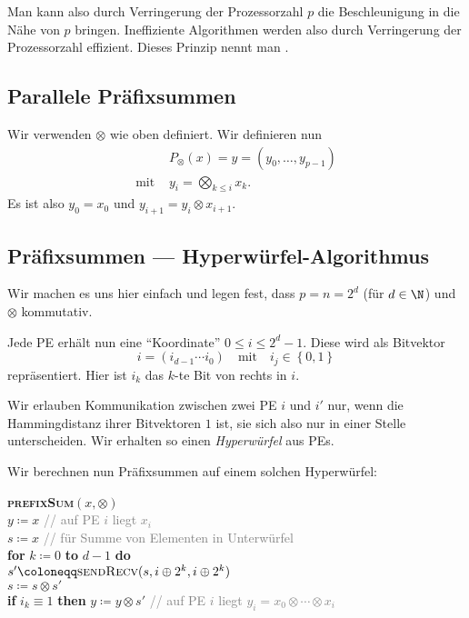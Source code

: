 Man kann also durch Verringerung der Prozessorzahl \( p \) die Beschleunigung in die Nähe von \( p \) bringen. Ineffiziente Algorithmen werden also durch Verringerung der Prozessorzahl effizient. Dieses Prinzip nennt man .


\subsection{Parallele Präfixsummen}

Wir verwenden \( \otimes \) wie oben definiert. Wir definieren nun
\begin{align*}
  &P_\otimes(x) = y = (y_0,\dots,y_{p-1}) \\
  \text{mit } &y_i = \bigotimes_{k \leq i}x_k\text{.} %
\end{align*}
Es ist also \( y_0 = x_0 \) und \( y_{i+1} = y_i \otimes x_{i+1} \).

\subsection{Präfixsummen --- Hyperwürfel-Algorithmus}

Wir machen es uns hier einfach und legen fest, dass \( p = n = 2^d \) (für \( d \in \N \)) und \( \otimes \) kommutativ.

Jede PE erhält nun eine ``Koordinate'' \( 0 \leq i \leq 2^d-1 \). Diese wird als Bitvektor
\begin{equation*}
  i = (i_{d-1}\cdots i_0) \quad \text{mit} \quad i_j \in \left \{ 0,1 \right \}
\end{equation*}
repräsentiert. Hier ist \( i_k \) das \( k \)-te Bit von rechts in \( i \).

Wir erlauben Kommunikation zwischen zwei PE \( i \) und \( i' \) nur, wenn die Hammingdistanz ihrer Bitvektoren \( 1 \) ist, sie sich also nur in einer Stelle unterscheiden. Wir erhalten so einen \emph{Hyperwürfel} aus PEs.

Wir berechnen nun Präfixsummen auf einem solchen Hyperwürfel:

\begin{pseudocode}
  \textbf{\textsc{prefixSum}}\( (x,\otimes) \) \\
  \( y \coloneqq x \) \enskip \textcolor{gray}{// auf PE \( i \) liegt \( x_i \)} \\
  \( s \coloneqq x \) \enskip \textcolor{gray}{// für Summe von Elementen in Unterwürfel} \\
  \textbf{for} \( k \coloneqq 0 \) \textbf{to} \( d - 1 \) \textbf{do} \\
  \phantom{\enskip} \( s' \coloneqq \textsc{sendRecv}(s,i \oplus 2^k, i \oplus 2^k) \) \\
  \phantom{\enskip} \( s \coloneqq s \otimes s' \) \\
  \phantom{\enskip} \textbf{if} \( i_k \equiv 1 \) \textbf{then} \( y \coloneqq y \otimes s' \) 
  \textcolor{gray}{// auf PE \( i \) liegt \( y_i = x_0 \otimes \cdots \otimes x_i \)}
\end{pseudocode}

